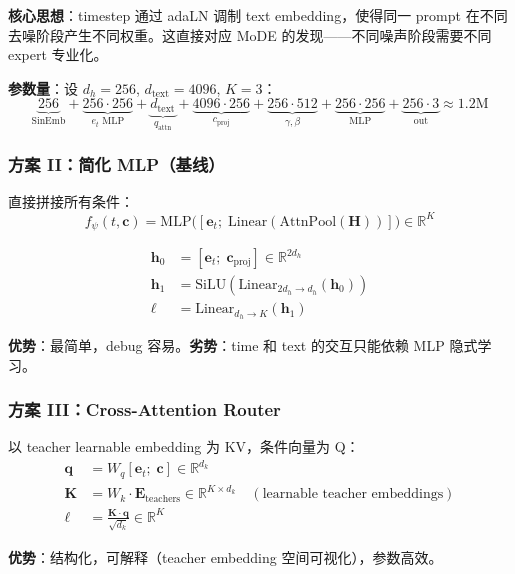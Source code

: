 \documentclass[11pt,a4paper]{article}
\newcommand{\R}{\mathbb{R}}
\theoremstyle{definition}
\begin{document}
\textbf{核心思想}：timestep 通过 adaLN 调制 text embedding，使得同一 prompt 在不同去噪阶段产生不同权重。这直接对应 MoDE 的发现——不同噪声阶段需要不同 expert 专业化。

\textbf{参数量}：设 $d_h = 256$, $d_{\text{text}} = 4096$, $K = 3$：
\[
\underbrace{256}_{\text{SinEmb}} + \underbrace{256 \cdot 256}_{e_t\text{ MLP}} + \underbrace{d_{\text{text}}}_{q_{\text{attn}}} + \underbrace{4096 \cdot 256}_{c_{\text{proj}}} + \underbrace{256 \cdot 512}_{\gamma,\beta} + \underbrace{256 \cdot 256}_{\text{MLP}} + \underbrace{256 \cdot 3}_{\text{out}} \approx 1.2\text{M}
\]

\subsubsection{方案 II：简化 MLP（基线）}

直接拼接所有条件：
\begin{equation}
f_\psi(t, \mathbf{c}) = \text{MLP}\bigl([\mathbf{e}_t;\; \text{Linear}(\text{AttnPool}(\mathbf{H}))]\bigr) \in \R^K
\end{equation}

\begin{align}
\mathbf{h}_0 &= [\mathbf{e}_t;\; \mathbf{c}_{\text{proj}}] \in \R^{2d_h} \\
\mathbf{h}_1 &= \text{SiLU}(\text{Linear}_{2d_h \to d_h}(\mathbf{h}_0)) \\
\bm{\ell} &= \text{Linear}_{d_h \to K}(\mathbf{h}_1)
\end{align}

\textbf{优势}：最简单，debug 容易。\textbf{劣势}：time 和 text 的交互只能依赖 MLP 隐式学习。

\subsubsection{方案 III：Cross-Attention Router}

以 teacher learnable embedding 为 KV，条件向量为 Q：
\begin{align}
\mathbf{q} &= W_q [\mathbf{e}_t;\; \mathbf{c}] \in \R^{d_k} \\
\mathbf{K} &= W_k \cdot \mathbf{E}_{\text{teachers}} \in \R^{K \times d_k} \quad (\text{learnable teacher embeddings}) \\
\bm{\ell} &= \frac{\mathbf{K} \cdot \mathbf{q}}{\sqrt{d_k}} \in \R^K
\end{align}

\textbf{优势}：结构化，可解释（teacher embedding 空间可视化），参数高效。
\end{document}
